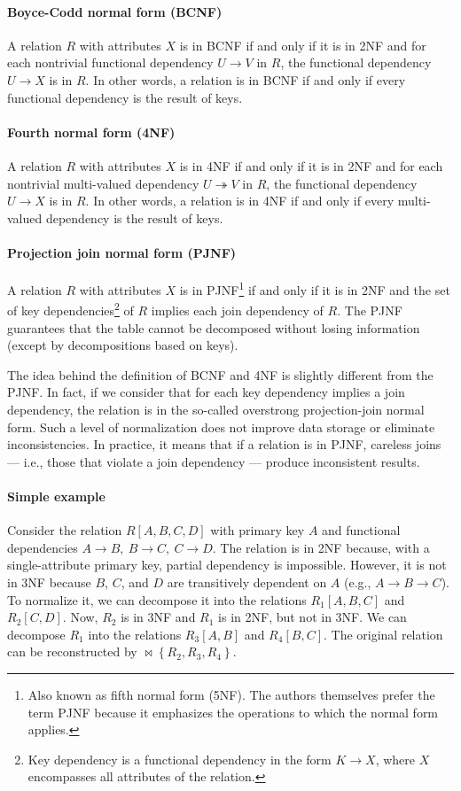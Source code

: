 \paragraph{Boyce-Codd normal form (BCNF)}  A relation $R$ with attributes $X$ is in BCNF
if and only if it is in 2NF and for each nontrivial functional dependency $U \to V$ in
$R$, the functional dependency $U \to X$ is in $R$.  In other words, a relation is in BCNF
if and only if every functional dependency is the result of keys.

\paragraph{Fourth normal form (4NF)}  A relation $R$ with attributes $X$ is in 4NF if
and only if it is in 2NF and for each nontrivial multi-valued dependency $U \twoheadrightarrow
V$ in $R$, the functional dependency $U \to X$ is in $R$.  In other words, a relation is
in 4NF if and only if every multi-valued dependency is the result of keys.

\paragraph{Projection join normal form (PJNF)} A relation $R$ with attributes $X$ is in
PJNF\footnote{Also known as fifth normal form (5NF).  The authors themselves prefer
the term PJNF because it emphasizes the operations to which the normal form applies.}
if and only if it is in 2NF and
the set of key dependencies\footnote{Key dependency is a functional dependency in the form
$K \to X$, where $X$ encompasses all attributes of the relation.} of $R$ implies each join
dependency of $R$.  The PJNF guarantees that the
table cannot be decomposed without losing information (except by decompositions based on
keys).

The idea behind the definition of BCNF and 4NF is slightly different from the
PJNF.  In fact, if we consider that for each key dependency implies a join dependency, the
relation is in the so-called overstrong projection-join normal
form.  Such a level of normalization does not improve data storage
or eliminate inconsistencies.  In practice, it means that if a relation is in PJNF,
careless joins --- i.e., those that violate a join dependency --- produce
inconsistent results.

\paragraph{Simple example}  Consider the relation $R[A, B, C, D]$ with primary key $A$ and
functional dependencies $A \to B,~B \to C,~C \to D$.  The relation is in 2NF because,
with a single-attribute primary key, partial dependency is impossible.  However, it is not
in 3NF because $B$, $C$, and $D$ are transitively dependent on $A$ (e.g., $A \to B \to C$).
To normalize it, we can decompose it into the relations $R_1[A, B, C]$ and $R_2[C, D]$.
Now, $R_2$ is in 3NF and $R_1$ is in 2NF, but not in 3NF.  We can decompose $R_1$ into the
relations $R_3[A, B]$ and $R_4[B, C]$.  The original relation can be reconstructed by
$\bowtie \left\{ R_2, R_3, R_4 \right\}$.

